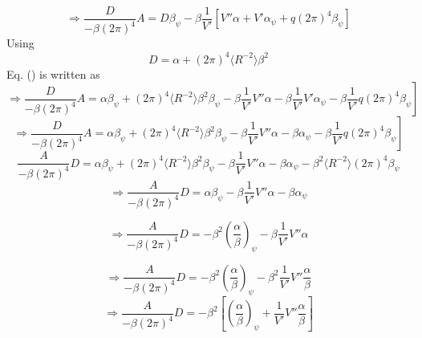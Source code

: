 \documentclass{article}
\begin{document}
\begin{equation}
  \Longrightarrow \frac{D}{- \beta (2 \pi)^4} A = D \beta_{\psi} - \beta
  \frac{1}{V'} [V'' \alpha + V' \alpha_{\psi} + q (2 \pi)^4 \beta_{\psi}]
\end{equation}
Using
\begin{equation}
  D = \alpha + (2 \pi)^4 \langle R^{- 2} \rangle \beta^2
\end{equation}
Eq. () is written as
\begin{equation}
  \left. \Longrightarrow \frac{D}{- \beta (2 \pi)^4} A = \alpha \beta_{\psi} +
  (2 \pi)^4 \langle R^{- 2} \rangle \beta^2 \beta_{\psi} - \beta \frac{1}{V'}
  V'' \alpha - \beta \frac{1}{V'} V' \alpha_{\psi} - \beta \frac{1}{V'} q (2
  \pi)^4 \beta_{\psi} \right]
\end{equation}
\begin{equation}
  \left. \Longrightarrow \frac{D}{- \beta (2 \pi)^4} A = \alpha \beta_{\psi} +
  (2 \pi)^4 \langle R^{- 2} \rangle \beta^2 \beta_{\psi} - \beta \frac{1}{V'}
  V'' \alpha - \beta \alpha_{\psi} - \beta \frac{1}{V'} q (2 \pi)^4
  \beta_{\psi} \right]
\end{equation}
\begin{equation}
  \frac{A}{- \beta (2 \pi)^4} D = \alpha \beta_{\psi} + (2 \pi)^4 \langle R^{-
  2} \rangle \beta^2 \beta_{\psi} - \beta \frac{1}{V'} V'' \alpha - \beta
  \alpha_{\psi} - \beta^2 \langle R^{- 2} \rangle (2 \pi)^4 \beta_{\psi}
\end{equation}
\begin{equation}
  \Longrightarrow \frac{A}{- \beta (2 \pi)^4} D = \alpha \beta_{\psi} - \beta
  \frac{1}{V'} V'' \alpha - \beta \alpha_{\psi}
\end{equation}

\begin{equation}
  \Longrightarrow \frac{A}{- \beta (2 \pi)^4} D = - \beta^2 \left(
  \frac{\alpha}{\beta} \right)_{\psi} - \beta \frac{1}{V'} V'' \alpha
\end{equation}

\begin{equation}
  \Longrightarrow \frac{A}{- \beta (2 \pi)^4} D = - \beta^2 \left(
  \frac{\alpha}{\beta} \right)_{\psi} - \beta^2 \frac{1}{V'} V''
  \frac{\alpha}{\beta}
\end{equation}
\begin{equation}
  \Longrightarrow \frac{A}{- \beta (2 \pi)^4} D = - \beta^2 \left[ \left(
  \frac{\alpha}{\beta} \right)_{\psi} + \frac{1}{V'} V'' \frac{\alpha}{\beta}
  \right]
\end{equation}
\end{document}
